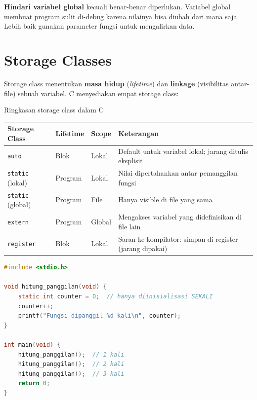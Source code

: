 \documentclass[../main.tex]{subfiles}
\begin{document}
\begin{catatan}
\textbf{Hindari variabel global} kecuali benar-benar diperlukan. Variabel global membuat program sulit di-debug karena nilainya bisa diubah dari mana saja. Lebih baik gunakan parameter fungsi untuk mengalirkan data.
\end{catatan}

\section{Storage Classes}

Storage class menentukan \textbf{masa hidup} (\textit{lifetime}) dan \textbf{linkage} (visibilitas antar-file) sebuah variabel. C menyediakan empat storage class:

\begin{modultable}[]{Ringkasan storage class dalam C}
\begin{tabular}{|l|l|l|p{5.5cm}|}
\hline
\textbf{Storage Class} & \textbf{Lifetime} & \textbf{Scope} & \textbf{Keterangan} \\
\hline
\texttt{auto} & Blok & Lokal & Default untuk variabel lokal; jarang ditulis eksplisit \\
\hline
\texttt{static} (lokal) & Program & Lokal & Nilai dipertahankan antar pemanggilan fungsi \\
\hline
\texttt{static} (global) & Program & File & Hanya visible di file yang sama \\
\hline
\texttt{extern} & Program & Global & Mengakses variabel yang didefinisikan di file lain \\
\hline
\texttt{register} & Blok & Lokal & Saran ke kompilator: simpan di register (jarang dipakai) \\
\hline
\end{tabular}
\end{modultable}

\begin{lstlisting}[language=C,caption=\texttt{static} lokal --- counter yang bertahan]
#include <stdio.h>

void hitung_panggilan(void) {
    static int counter = 0;  // hanya diinisialisasi SEKALI
    counter++;
    printf("Fungsi dipanggil %d kali\n", counter);
}

int main(void) {
    hitung_panggilan();  // 1 kali
    hitung_panggilan();  // 2 kali
    hitung_panggilan();  // 3 kali
    return 0;
}
\end{lstlisting}
\end{document}
